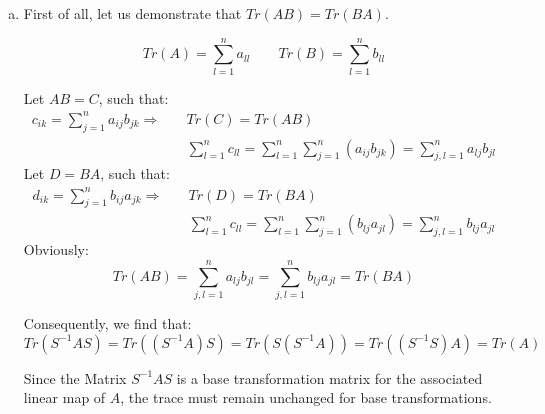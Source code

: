 \documentclass[a4paper,german,12pt,smallheadings]{scrartcl}
\begin{document}
\begin{enumerate}[(a)]
\item First of all, let us demonstrate that $Tr(AB)=Tr(BA)$.

\begin{equation*}
Tr(A)=\sum_{l=1}^{n}a_{ll} \quad \quad Tr(B)=\sum_{l=1}^{n}b_{ll}
\end{equation*}

Let $AB=C$, such that:
\begin{align*}
c_{ik}=\sum_{j=1}^{n}{a_{ij}b_{jk }}
\Rightarrow &\quad Tr(C)=Tr(AB)\\
&\quad \sum_{l=1}^{n}c_{ll}=\sum_{l=1}^{n}\sum_{j=1}^{n}\left({a_{ij}b_{jk}}\right)=\sum_{j,l=1}^{n}a_{lj}b_{jl}
\end{align*}
Let $D=BA$, such that:
\begin{align*}
d_{ik}=\sum_{j=1}^{n}{b_{ij}a_{jk }}
\Rightarrow &\quad Tr(D)=Tr(BA)\\
&\quad \sum_{l=1}^{n}c_{ll}=\sum_{l=1}^{n}\sum_{j=1}^{n}\left({b_{lj}a_{jl}}\right)=\sum_{j,l=1}^{n}b_{lj}a_{jl}
\end{align*}
Obviously:
\begin{equation*}
Tr(AB)=\sum_{j,l=1}^{n}a_{lj}b_{jl}=\sum_{j,l=1}^{n}b_{lj}a_{jl}=Tr(BA)
\end{equation*}

Consequently, we find that:
\begin{equation*}
Tr(S^{-1}AS)=Tr((S^{-1}A)S)=Tr(S(S^{-1}A))=Tr((S^{-1}S)A)=Tr(A)
\end{equation*}

Since the Matrix $S^{-1}AS$ is a base transformation matrix for the associated linear map of $A$, the trace must remain unchanged for base transformations.

\end{enumerate}
\end{document}
